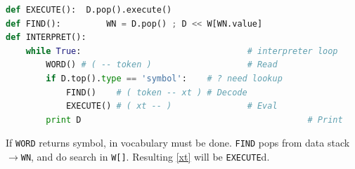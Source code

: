 \begin{lstlisting}[language=Python]
def EXECUTE():	D.pop().execute()
def FIND():			WN = D.pop() ; D << W[WN.value]
def INTERPRET():
	while True:									# interpreter loop
		WORD() # ( -- token )					# Read
		if D.top().type == 'symbol':	# ? need lookup
			FIND()    # ( token -- xt )	# Decode
			EXECUTE() # ( xt -- )				# Eval
		print D												# Print
\end{lstlisting}
If \verb|WORD| returns symbol,  in vocabulary must be done.
\verb|FIND| pops  from data stack $\rightarrow$\verb|WN|, and do
search in \verb|W[]|. Resulting  \ref{xt} will be
\verb|EXECUTE|d.
